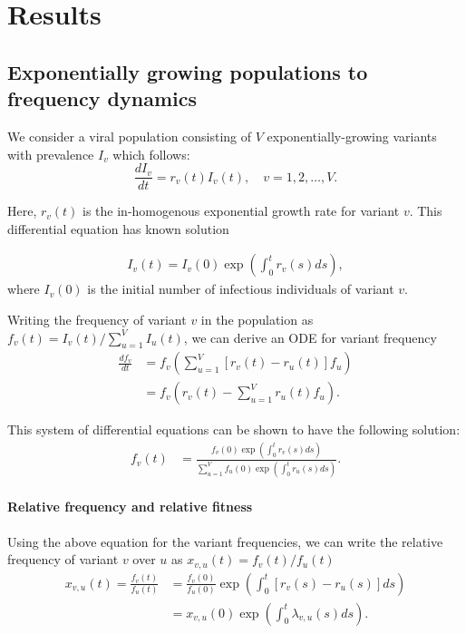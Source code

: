 \documentclass[12pt,oneside,letterpaper]{article}
\begin{document}
\section*{Results}

\subsection*{Exponentially growing populations to frequency dynamics}%

We consider a viral population consisting of $V$ exponentially-growing variants with prevalence $I_{v}$ which follows:
\begin{equation} \label{eq:inhomo_exp_growth}
    \frac{d I_{v}}{d t} = r_{v}(t) I_{v}(t), \quad v = 1,2, \ldots, V.
\end{equation}

Here, $r_{v}(t)$ is the in-homogenous exponential growth rate for variant $v$.
This differential equation has known solution

\begin{align*}
I_{v}(t) = I_{v}(0) \exp\left( \int_{0}^{t} r_{v}(s) ds\right),
\end{align*}
where $I_{v}(0)$ is the initial number of infectious individuals of variant $v$. 

Writing the frequency of variant $v$ in the population as  $f_{v}(t) = I_{v}(t) / \sum_{u=1}^{V} I_{u}(t)$, we can derive an ODE for variant frequency
\begin{align*}
    \frac{d f_{v}}{d t} &= f_{v} \left( \sum_{u=1}^{V} [r_{v}(t) - r_{u}(t)] f_{u} \right)\\
                        &= f_{v} \left( r_{v}(t) - \sum_{u=1}^{V} r_{u}(t) f_{u} \right).
\end{align*}

This system of differential equations can be shown to have the following solution:
\begin{align}
    f_{v}(t) &= \frac{ f_{v}(0) \exp( \int_{0}^{t} r_{v}(s) ds)}{\sum_{u=1}^{V}  f_{u}(0) \exp( \int_{0}^{t} r_{u}(s) ds)}.
\end{align}


\paragraph{Relative frequency and relative fitness}%

Using the above equation for the variant frequencies, we can write the relative frequency of variant $v$ over $u$ as $x_{v,u}(t) = f_{v}(t) / f_{u}(t)$
\begin{align*}
    x_{v, u}(t) = \frac{f_{v}(t)}{f_{u}(t)} &= \frac{f_{v}(0)}{f_{u}(0)} \exp \left( \int_{0}^{t} [r_{v}(s) - r_{u}(s)] ds \right)\\
                                            &=x_{v,u}(0)\exp \left( \int_{0}^{t} \lambda_{v,u}(s) ds \right).
\end{align*}
\end{document}
